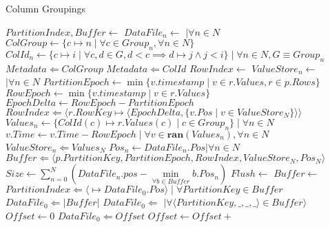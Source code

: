 \documentclass[fleqn]{article}
\begin{document}
\begin{algorithm}
\scriptsize
\caption{Column Groupings}
\begin{algorithmic}[1]
\State $PartitionIndex, Buffer \gets $ 
\State $DataFile_{n} \gets $  $\mid \forall n \in N$
\Statex
\State $ColGroup \gets \{c \mapsto n \mid \forall c \in Group_{n}, \forall n \in N \}$
\State $ColId_{n} \gets \{c \mapsto i \mid \forall c, d \in G, d < c \implies d \mapsto j \wedge j < i \} \mid \forall n \in N, G \equiv Group_{n}$
\State $Metadata \Leftarrow ColGroup$
\State $Metadata \Leftarrow ColId$
\Statex
{} 
 \State $RowIndex \gets $ 
 \State $ValueStore_{n} \gets $  $ \mid \forall n \in N$
 \State $PartitionEpoch \gets \min \{v.timestamp \mid v \in r.Values, r \in p.Rows\}$
 \Statex
   \State $RowEpoch \gets \min \{v.timestamp \mid v \in r.Values\}$
   \State $EpochDelta \gets RowEpoch - PartitionEpoch$
   \State $RowIndex \Leftarrow \langle r.RowKey \mapsto \langle EpochDelta, \{ v.Pos \mid v \in ValueStore_{N} \}\rangle \rangle $ 
   \State $Values_{n} \gets \{ ColId(c) \mapsto r.Values(c) \mid c \in Group_{n} \} \mid \forall n \in N$
   \State $v.Time \gets v.Time - RowEpoch \mid \forall v \in \mathbf{ran}(Values_{n}), \forall n \in N$
   \State $ ValueStore_{n} \Leftarrow Values_{N} $
 \EndFor
\Statex
 \State $Pos_{n} \gets DataFile_{n}.Pos | \forall n \in N$
 \State $Buffer \Leftarrow \langle p.PartitionKey, PartitionEpoch, RowIndex, ValueStore_{N}, Pos_{N} \rangle$
 \State $Size \gets \sum\limits_{n=0}^{N} (DataFile_{n}.pos - \min\limits_{\forall b \in Buffer} b.Pos_{n}) $
   \State $Flush \gets$ 
   \State {}
   \State $Buffer \gets $ 
 \EndIf
\EndFor
\State {}
\EndProcedure
\Statex
{}
   \State $PartitionIndex \Leftarrow \langle $$ \mapsto DataFile_{0}.Pos \rangle \mid \forall PartitionKey \in Buffer$
   \State $DataFile_{0} \Leftarrow \lvert Buffer \rvert$
   \State $DataFile_{0} \Leftarrow $  $ \mid \forall \langle PartitionKey, \_,\_,\_\rangle \in Buffer \rangle$
   \State $Offset \gets 0$
     \State $DataFile_0 \Leftarrow Offset$
     \State $Offset \gets Offset + $ 

\end{algorithmic}
\end{algorithm}
\end{document}
